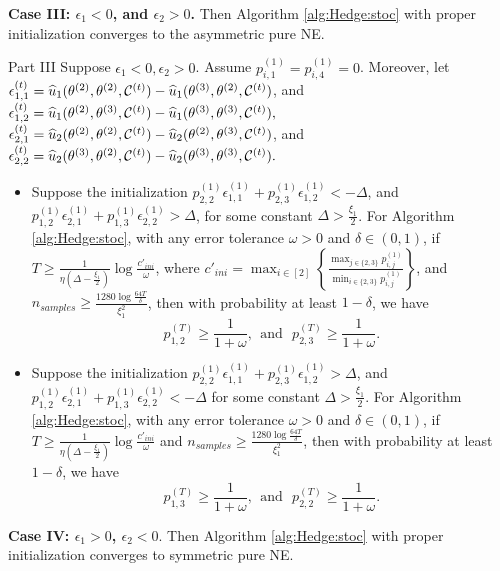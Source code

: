\noindent \textbf{Case III: $\epsilon_1<0$, and $\epsilon_2>0$.} Then Algorithm \ref{alg:Hedge:stoc} with proper initialization converges to the asymmetric pure NE. 

\begin{fixedtheorem}{Part III}
Suppose $\epsilon_1<0,\epsilon_2>0$. Assume $p^{(1)}_{i,1}=p^{(1)}_{i,4}=0$. 
Moreover, let $\epsilon^{(t)}_{1,1} = \widehat{u}_1(\theta^{(2)},\theta^{(2)},\mathcal{C}^{(t)})-\widehat{u}_1(\theta^{(3)},\theta^{(2)},\mathcal{C}^{(t)})$, and $\epsilon^{(t)}_{1,2} = \widehat{u}_1(\theta^{(2)},\theta^{(3)},\mathcal{C}^{(t)})-\widehat{u}_1(\theta^{(3)},\theta^{(3)},\mathcal{C}^{(t)}),$ $\epsilon^{(t)}_{2,1} = \widehat{u}_2(\theta^{(2)},\theta^{(2)},\mathcal{C}^{(t)})-\widehat{u}_2(\theta^{(2)},\theta^{(3)},\mathcal{C}^{(t)})$, and $\epsilon^{(t)}_{2,2} = \widehat{u}_2(\theta^{(3)},\theta^{(2)},\mathcal{C}^{(t)})-\widehat{u}_2(\theta^{(3)},\theta^{(3)},\mathcal{C}^{(t)}).$
\begin{itemize}
\item Suppose the initialization 
$p^{(1)}_{2,2}\epsilon^{(1)}_{1,1}+p^{(1)}_{2,3}\epsilon^{(1)}_{1,2}<-\Delta$, and $p^{(1)}_{1,2}\epsilon^{(1)}_{2,1}+p^{(1)}_{1,3}\epsilon^{(1)}_{2,2}>\Delta$, for some constant $\Delta>\frac{\xi_1}{2}$. For Algorithm \ref{alg:Hedge:stoc}, with any error tolerance $\omega>0$ and $\delta\in(0,1)$, if $T\geq \frac{1}{\eta\left(\Delta-\frac{\xi_1}{2}\right)}\log\frac{c'_{ini}}{\omega}$, where $c'_{ini}=\max_{i\in[2]}\left\{\frac{\max_{j\in\{2,3\}}p^{(1)}_{i,j}}{\min_{i\in\{2,3\}}p^{(1)}_{i,j}}\right\}$, and $n_{samples}\geq \frac{1280\log\frac{64T}{\delta}}{\xi_1^2}$, then with probability at least $1-\delta$, we have 
$$p^{(T)}_{1,2}\geq \frac{1}{1+\omega},\ \  \text{and}\ \ \  p^{(T)}_{2,3}\geq \frac{1}{1+\omega}.$$  
\item Suppose the initialization $p^{(1)}_{2,2}\epsilon^{(1)}_{1,1}+p^{(1)}_{2,3}\epsilon^{(1)}_{1,2}>\Delta$, and $p^{(1)}_{1,2}\epsilon^{(1)}_{2,1}+p^{(1)}_{1,3}\epsilon^{(1)}_{2,2}<-\Delta$ for some constant $\Delta>\frac{\xi_1}{2}$. For Algorithm \ref{alg:Hedge:stoc}, with any error tolerance $\omega>0$ and $\delta\in(0,1)$, if $T\geq \frac{1}{\eta\left(\Delta-\frac{\xi_1}{2}\right)}\log\frac{c'_{ini}}{\omega}$ and $n_{samples}\geq \frac{1280\log\frac{64T}{\delta}}{\xi_1^2}$, then with probability at least $1-\delta$, we have $$p^{(T)}_{1,3}\geq \frac{1}{1+\omega},\ \  \text{and}\ \ \  p^{(T)}_{2,2}\geq \frac{1}{1+\omega}.$$ 
\end{itemize}
\end{fixedtheorem}


\noindent\textbf{Case IV: $\epsilon_1>0$, $\epsilon_2<0$}. Then Algorithm \ref{alg:Hedge:stoc}  with proper initialization converges to symmetric pure NE.

